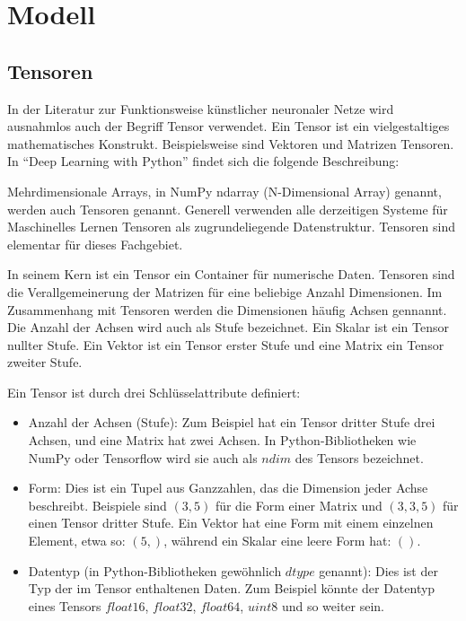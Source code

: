 \chapter{Modell}
\label{ch:model}

\section{Tensoren}
In der Literatur zur Funktionsweise künstlicher neuronaler Netze wird ausnahmlos auch der Begriff Tensor verwendet. Ein Tensor ist ein vielgestaltiges mathematisches Konstrukt. Beispielsweise sind Vektoren und Matrizen Tensoren. In ``Deep Learning with Python'' \cite{chollet2021deep} findet sich die folgende Beschreibung:

Mehrdimensionale Arrays, in NumPy ndarray (N-Dimensional Array) genannt, werden auch Tensoren genannt. Generell verwenden alle derzeitigen Systeme für Maschinelles Lernen Tensoren als zugrundeliegende Datenstruktur. Tensoren sind elementar für dieses Fachgebiet.

In seinem Kern ist ein Tensor ein Container für numerische Daten. Tensoren sind die Verallgemeinerung der Matrizen für eine beliebige Anzahl Dimensionen. Im Zusammenhang mit Tensoren werden die Dimensionen häufig Achsen gennannt. Die Anzahl der Achsen wird auch als Stufe bezeichnet. Ein Skalar ist ein Tensor nullter Stufe. Ein Vektor ist ein Tensor erster Stufe und eine Matrix ein Tensor zweiter Stufe.

Ein Tensor ist durch drei Schlüsselattribute definiert:
\begin{itemize}
\item Anzahl der Achsen (Stufe): Zum Beispiel hat ein Tensor dritter Stufe drei Achsen, und eine Matrix hat zwei Achsen. In Python-Bibliotheken wie NumPy oder Tensorflow wird sie auch als $ndim$ des Tensors bezeichnet.
\item Form: Dies ist ein Tupel aus Ganzzahlen, das die Dimension jeder Achse beschreibt. Beispiele sind $(3, 5)$ für die Form einer Matrix und $(3, 3, 5)$ für einen Tensor dritter Stufe. Ein Vektor hat eine Form mit einem einzelnen Element, etwa so: $(5,)$, während ein Skalar eine leere Form hat: $()$.
\item Datentyp (in Python-Bibliotheken gewöhnlich $dtype$ genannt): Dies ist der Typ der im Tensor enthaltenen Daten. Zum Beispiel könnte der Datentyp eines Tensors $float16$, $float32$, $float64$, $uint8$ und so weiter sein.
\end{itemize}
\cite{chollet2021deep}

